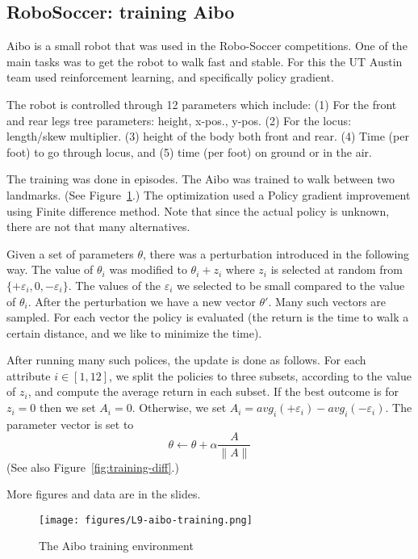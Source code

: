 \subsection{RoboSoccer: training Aibo}

Aibo is a small robot that was used in the Robo-Soccer competitions.
One of the main tasks was to get the robot to walk fast and stable.
For this the UT Austin team used reinforcement learning, and
specifically policy gradient.

The robot is controlled through 12 parameters which include: (1) For
the front and rear legs tree parameters: height, x-pos., y-pos. (2)
For the locus:  length/skew multiplier. (3) height of the body both
front and rear. (4) Time (per foot) to go through locus, and (5)
time (per foot) on ground or in the air.

The training was done in episodes. The Aibo was trained to walk
between two landmarks. (See Figure~\ref{fig:aibo-training}.) The
optimization used a Policy gradient improvement using Finite
difference method. Note that since the actual policy is unknown,
there are not that many alternatives.

Given a set of parameters $\theta$, there was a perturbation
introduced in the following way. The value of $\theta_i$ was
modified to $\theta_i+z_i$ where $z_i$ is selected at random from
$\{+\varepsilon_i,0,-\varepsilon_i\}$. The values of the
$\varepsilon_i$ we selected to be small compared to the value of
$\theta_i$. After the perturbation we have a new vector $\theta'$.
Many such vectors are sampled. For each vector the policy is
evaluated (the return is the time to walk a certain distance, and we
like to minimize the time).

After running many such polices, the update is done as follows. For
each attribute $i\in[1,12]$, we split the policies to three subsets,
according to the value of $z_i$, and compute the average return in
each subset. If the best outcome is for $z_i=0$ then we set $A_i=0$.
Otherwise, we set $A_i=
avg_i(+\varepsilon_i)-avg_i(-\varepsilon_i)$. The parameter vector
is set to
\[
\theta \leftarrow \theta +\alpha \frac{A}{\|A\|}
\]
(See also Figure~\ref{fig:training-diff}.)

More figures and data are in the slides.



\begin{figure}
  \begin{centering}
\texttt{[image: figures/L9-aibo-training.png]}\\
  \caption{The Aibo training environment }\label{fig:aibo-training}
  \end{centering}
\end{figure}


